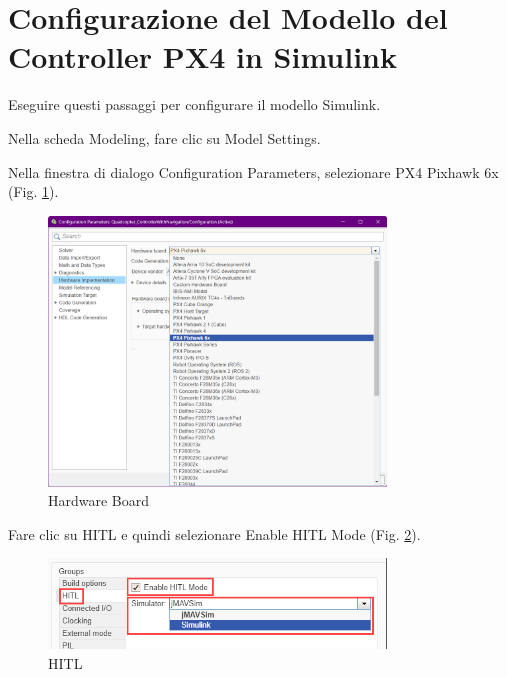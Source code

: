 \section{Configurazione del Modello del Controller PX4 in Simulink}
Eseguire questi passaggi per configurare il modello Simulink.

Nella scheda Modeling, fare clic su Model Settings.

Nella finestra di dialogo Configuration Parameters, selezionare PX4 Pixhawk 6x (Fig. \ref{fig:Hardware Board}).
\begin{figure}[H] %
  \centering
  \includegraphics[width=0.8\textwidth]{files/images/matlab1.png} %
  \caption{Hardware Board} %
  \label{fig:Hardware Board} %
\end{figure}
\noindent
Fare clic su HITL e quindi selezionare Enable HITL Mode (Fig. \ref{fig:HITL}).
\begin{figure}[H] %
  \centering
  \includegraphics[width=0.8\textwidth]{files/images/HITL.png} %
  \caption{HITL} %
  \label{fig:HITL} %
\end{figure}

